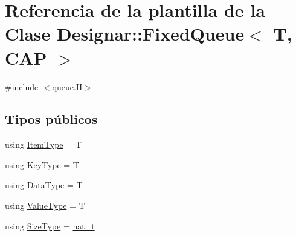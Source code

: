 \hypertarget{class_designar_1_1_fixed_queue}{}\section{Referencia de la plantilla de la Clase Designar\+:\+:Fixed\+Queue$<$ T, C\+AP $>$}
\label{class_designar_1_1_fixed_queue}


{\ttfamily \#include $<$queue.\+H$>$}

\subsection*{Tipos públicos}
\begin{DoxyCompactItemize}
\item 
using \hyperlink{class_designar_1_1_fixed_queue_aa1c356bc74a041121662af027abf279b}{Item\+Type} = T
\item 
using \hyperlink{class_designar_1_1_fixed_queue_a37999fa3f2fa0aacaf67d94e6da50f3d}{Key\+Type} = T
\item 
using \hyperlink{class_designar_1_1_fixed_queue_a0638afcff4eb29040d4573212558da5f}{Data\+Type} = T
\item 
using \hyperlink{class_designar_1_1_fixed_queue_a3507ad9a592d5ade2c7cfe0b9484a4b0}{Value\+Type} = T
\item 
using \hyperlink{class_designar_1_1_fixed_queue_a900c2a6d70517602bd8bc9dc7894c104}{Size\+Type} = \hyperlink{namespace_designar_aa72662848b9f4815e7bf31a7cf3e33d1}{nat\+\_\+t}
\end{DoxyCompactItemize}
